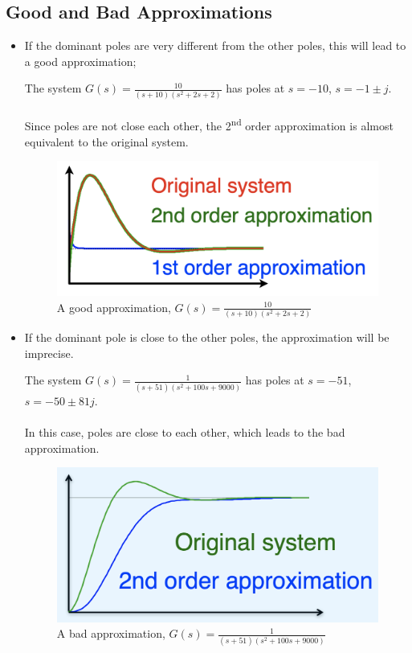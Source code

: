 \subsection{Good and Bad Approximations}
\begin{itemize}
    \item If the dominant poles are very different from the other poles, this will lead to a good approximation;
        \begin{ex}{}
            The system $\displaystyle G(s)=\frac{10}{(s+10)(s^{2}+2s+2)}$ has poles at $s = -10$, $s = -1 \pm j$. \\\\Since poles are not close each other, the 2\textsuperscript{nd} order approximation is almost equivalent to the original system.
            \begin{figure}[H] \centering 
                \includegraphics[width=.4\textwidth]{images/good_approx.png}
                \caption{A good approximation, $G(s)=\frac{10}{(s+10)(s^{2}+2s+2)}$}
            \end{figure}
        \end{ex}
    
    \item If the dominant pole is close to the other poles, the approximation will be imprecise.
        \begin{ex}{}
            The system $\displaystyle G(s)=\frac{1}{(s+51)(s^{2}+100s+9000)}$ has poles at $s = -51$, $s = -50 \pm 81j$.\\\\ In this case, poles are close to each other, which leads to the bad approximation.
            \begin{figure}[H] 
                \centering 
                \includegraphics[width=.4\textwidth]{images/bad_approx.png}
                \caption{A bad approximation, $G(s)=\frac{1}{(s+51)(s^{2}+100s+9000)}$}
            \end{figure}
        \end{ex}
\end{itemize}
